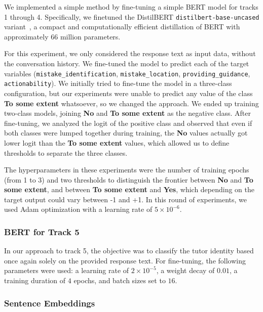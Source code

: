\documentclass[11pt]{article}
\newcommand{\todo}[1]{\textcolor{blue}{\textbf{\small [TODO: #1]}}}
\begin{document}
We implemented a simple method by fine-tuning a simple BERT model for tracks 1 through 4. 
Specifically, we finetuned the DistilBERT \texttt{distilbert-base-uncased} variant~\cite{sanh2020distilbert}, a compact and computationally efficient distillation of BERT with approximately 66 million parameters.

For this experiment, we only considered the response text as input data, without the conversation history. We fine-tuned the model to predict each of the target variables (\texttt{mistake\_identification}, \texttt{mistake\_location}, \texttt{providing\_guidance}, \texttt{actionability}).
We initially tried to fine-tune the model in a three-class configuration, but our experiments were unable to predict any value of the class \textbf{To some extent} whatsoever, so we changed the approach.
We ended up training two-class models, joining \textbf{No} and \textbf{To some extent} as the negative class.
After fine-tuning, we analyzed the logit of the positive class and observed that even if both classes were lumped together during training, the \textbf{No} values actually got lower logit than the \textbf{To some extent} values, which allowed us to define thresholds to separate the three classes.

The hyperparameters in these experiments were the number of training epochs (from 1 to 3) and two thresholds to distinguish the frontier between \textbf{No} and \textbf{To some extent}, and between \textbf{To some extent} and \textbf{Yes}, which depending on the target output could vary between -1 and +1. In this round of experiments, we used Adam optimization with a learning rate of $5 \times 10^{-6}$.

\subsubsection{BERT for Track 5}

In our approach to track 5, the objective was to classify the tutor identity based once again solely on the provided response text. For fine-tuning, the following parameters were used: a learning rate of $2 \times 10^{-5}$, a weight decay of $0.01$, a training duration of $4$ epochs, and batch sizes set to $16$.


\subsubsection{Sentence Embeddings}
\end{document}
